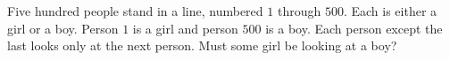 Five hundred people stand in a line, numbered $1$ through $500$. Each is either a girl or a boy. Person $1$ is a girl and person $500$ is a boy. Each person except the last looks only at the next person. Must some girl be looking at a boy?

